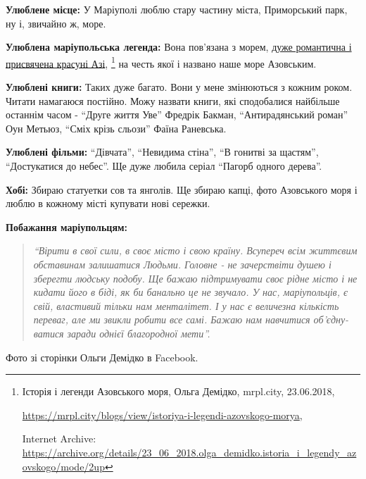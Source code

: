 
\textbf{Улюблене місце:} У Маріуполі люблю стару частину міста, Приморський парк, ну і, звичайно ж, море.

\textbf{Улюблена маріупольська легенда:} Вона пов'язана з морем, \href{https://archive.org/details/23_06_2018.olga_demidko.istoria_i_legendy_azovskogo}{дуже романтична і присвячена красуні Азі},
\footnote{Історія і легенди Азовського моря, Ольга Демідко, mrpl.city, 23.06.2018, \par%
\url{https://mrpl.city/blogs/view/istoriya-i-legendi-azovskogo-morya}, \par%
Internet Archive: \url{https://archive.org/details/23_06_2018.olga_demidko.istoria_i_legendy_azovskogo/mode/2up}
}
на честь якої і названо наше море Азовським.

\textbf{Улюблені книги:} Таких дуже багато. Вони у мене змінюються з кожним роком.
Читати намагаюся постійно. Можу назвати книги, які сподобалися найбільше
останнім часом - \enquote{Друге життя Уве} Фредрік Бакман, \enquote{Антирадянський роман} Оун
Метьюз, \enquote{Сміх крізь сльози} Фаїна Раневська.

\textbf{Улюблені фільми:} \enquote{Дівчата}, \enquote{Невидима стіна}, \enquote{В гонитві за щастям},
\enquote{Достукатися до небес}. Ще дуже любила серіал \enquote{Пагорб одного дерева}.

\textbf{Хобі:} Збираю статуетки сов та янголів. Ще збираю капці, фото Азовського моря і
люблю в кожному місті купувати нові сережки.


\textbf{Побажання маріупольцям:} 

\begin{quote}
\em\enquote{Вірити в свої сили, в своє місто і свою країну.
Всупереч всім життєвим обставинам залишатися Людьми. Головне - не зачерствіти
душею і зберегти людську подобу. Ще бажаю підтримувати своє рідне місто і не
кидати його в біді, як би банально це не звучало. У нас, маріупольців, є свій,
властивий тільки нам менталітет. І у нас є величезна кількість переваг, але ми
звикли робити все самі. Бажаю нам навчитися об'єдну\hyp{}ватися заради однієї
благородної мети}.
\end{quote}

Фото зі сторінки Ольги Демідко в Facebook.
